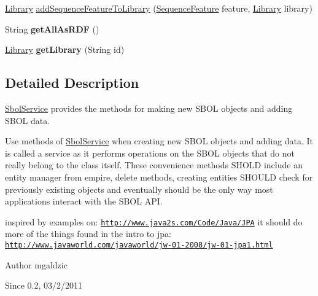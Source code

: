 \begin{DoxyCompactItemize}
\item 
\hyperlink{classorg_1_1sbolstandard_1_1lib_s_b_o_lj_1_1_library}{Library} \hyperlink{classorg_1_1sbolstandard_1_1lib_s_b_o_lj_1_1_sbol_service_a609be282e31515449d1c1161c0fb3449}{addSequenceFeatureToLibrary} (\hyperlink{classorg_1_1sbolstandard_1_1lib_s_b_o_lj_1_1_sequence_feature}{SequenceFeature} feature, \hyperlink{classorg_1_1sbolstandard_1_1lib_s_b_o_lj_1_1_library}{Library} library)
\item 
\hypertarget{classorg_1_1sbolstandard_1_1lib_s_b_o_lj_1_1_sbol_service_a2935124285c90cde22ae82010667b559}{
String {\bfseries getAllAsRDF} ()}
\label{classorg_1_1sbolstandard_1_1lib_s_b_o_lj_1_1_sbol_service_a2935124285c90cde22ae82010667b559}

\item 
\hypertarget{classorg_1_1sbolstandard_1_1lib_s_b_o_lj_1_1_sbol_service_ae14722b5b6e6dc92f21908a2693dad14}{
\hyperlink{classorg_1_1sbolstandard_1_1lib_s_b_o_lj_1_1_library}{Library} {\bfseries getLibrary} (String id)}
\label{classorg_1_1sbolstandard_1_1lib_s_b_o_lj_1_1_sbol_service_ae14722b5b6e6dc92f21908a2693dad14}

\end{DoxyCompactItemize}


\subsection{Detailed Description}
\hyperlink{classorg_1_1sbolstandard_1_1lib_s_b_o_lj_1_1_sbol_service}{SbolService} provides the methods for making new SBOL objects and adding SBOL data.

Use methods of \hyperlink{classorg_1_1sbolstandard_1_1lib_s_b_o_lj_1_1_sbol_service}{SbolService} when creating new SBOL objects and adding data. It is called a service as it performs operations on the SBOL objects that do not really belong to the class itself. These convenience methods SHOLD include an entity manager from empire, delete methods, creating entities SHOULD check for previously existing objects and eventually should be the only way most applications interact with the SBOL API.

inspired by examples on: \href{http://www.java2s.com/Code/Java/JPA}{\tt http://www.java2s.com/Code/Java/JPA} it should do more of the things found in the intro to jpa: \href{http://www.javaworld.com/javaworld/jw-01-2008/jw-01-jpa1.html}{\tt http://www.javaworld.com/javaworld/jw-\/01-\/2008/jw-\/01-\/jpa1.html}

\begin{DoxyAuthor}{Author}
mgaldzic 
\end{DoxyAuthor}
\begin{DoxySince}{Since}
0.2, 03/2/2011 
\end{DoxySince}


